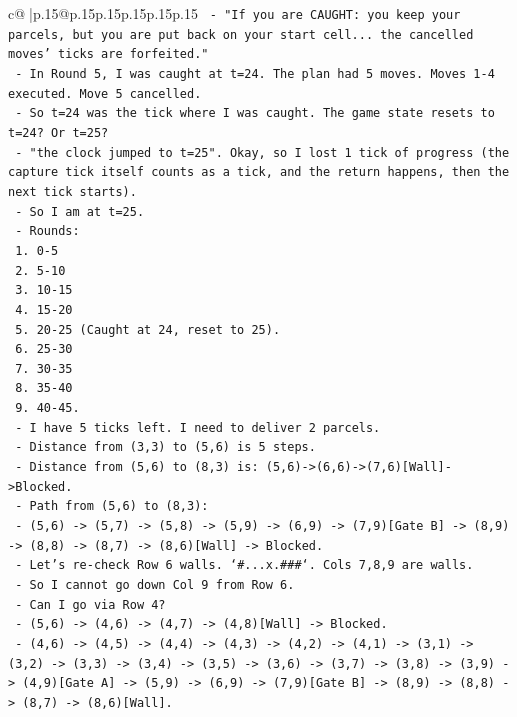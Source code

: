\documentclass{article}
\begin{document}
{\begin{supertabular}{c@{$\;$}|p{.15\linewidth}@{}p{.15\linewidth}p{.15\linewidth}p{.15\linewidth}p{.15\linewidth}p{.15\linewidth}}
{{{\texttt{  {-} "If you are CAUGHT: you keep your parcels, but you are put back on your start cell... the cancelled moves' ticks are forfeited."} \\
\texttt{  {-} In Round 5, I was caught at t=24. The plan had 5 moves. Moves 1{-}4 executed. Move 5 cancelled.} \\
\texttt{  {-} So t=24 was the tick where I was caught. The game state resets to t=24? Or t=25?} \\
\texttt{  {-} "the clock jumped to t=25". Okay, so I lost 1 tick of progress (the capture tick itself counts as a tick, and the return happens, then the next tick starts).} \\
\texttt{  {-} So I am at t=25.} \\
\texttt{  {-} Rounds:} \\
\texttt{    1. 0{-}5} \\
\texttt{    2. 5{-}10} \\
\texttt{    3. 10{-}15} \\
\texttt{    4. 15{-}20} \\
\texttt{    5. 20{-}25 (Caught at 24, reset to 25).} \\
\texttt{    6. 25{-}30} \\
\texttt{    7. 30{-}35} \\
\texttt{    8. 35{-}40} \\
\texttt{    9. 40{-}45.} \\
\texttt{  {-} I have 5 ticks left. I need to deliver 2 parcels.} \\
\texttt{  {-} Distance from (3,3) to (5,6) is 5 steps.} \\
\texttt{  {-} Distance from (5,6) to (8,3) is: (5,6){-}>(6,6){-}>(7,6){[}Wall{]}{-}>Blocked.} \\
\texttt{  {-} Path from (5,6) to (8,3):} \\
\texttt{    {-} (5,6) {-}> (5,7) {-}> (5,8) {-}> (5,9) {-}> (6,9) {-}> (7,9){[}Gate B{]} {-}> (8,9) {-}> (8,8) {-}> (8,7) {-}> (8,6){[}Wall{]} {-}> Blocked.} \\
\texttt{    {-} Let's re{-}check Row 6 walls. `\#...x.\#\#\#`. Cols 7,8,9 are walls.} \\
\texttt{    {-} So I cannot go down Col 9 from Row 6.} \\
\texttt{    {-} Can I go via Row 4?} \\
\texttt{    {-} (5,6) {-}> (4,6) {-}> (4,7) {-}> (4,8){[}Wall{]} {-}> Blocked.} \\
\texttt{    {-} (4,6) {-}> (4,5) {-}> (4,4) {-}> (4,3) {-}> (4,2) {-}> (4,1) {-}> (3,1) {-}> (3,2) {-}> (3,3) {-}> (3,4) {-}> (3,5) {-}> (3,6) {-}> (3,7) {-}> (3,8) {-}> (3,9) {-}> (4,9){[}Gate A{]} {-}> (5,9) {-}> (6,9) {-}> (7,9){[}Gate B{]} {-}> (8,9) {-}> (8,8) {-}> (8,7) {-}> (8,6){[}Wall{]}.} \\
}}}
\end{supertabular}}
\end{document}
